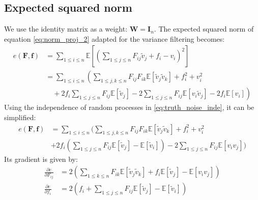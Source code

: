 \documentclass[12pt]{scrartcl}
\begin{document}
\subsection{Expected squared norm}
We use the identity matrix as a weight: $\mathbf{W} = \mathbf{I}_n$. The expected squared norm of equation \eqref{eq:norm_proj_2} adapted for the variance filtering becomes:
\begin{align}
e(\mathbf{F},\mathbf{f}) & = \sum_{1 \le i \le n} \mathbb{E}\left[ \left(\sum_{1 \le j \le n} F_{ij} \widetilde{v}_j + f_i - v_i \right)^2 \right] \nonumber \\
& = \sum_{1 \le i \le n} \left( \sum_{1 \le j,k \le n} F_{ij} F_{ik} \mathbb{E}\left[\widetilde{v}_j \widetilde{v}_k\right] + f_i^2 + v^2_i \right.\nonumber \\
& \left. \quad + 2 f_i \sum_{1 \le j \le n} F_{ij} \mathbb{E}\left[\widetilde{v}_j\right] - 2 \sum_{1 \le j \le n} F_{ij} \mathbb{E}\left[v_i\widetilde{v}_j\right] - 2 f_i \mathbb{E}\left[v_i\right]\right)
\end{align}
Using the independence of random processes in \eqref{eq:truth_noise_inde}, it can be simplified:
\begin{align}
e(\mathbf{F},\mathbf{f}) & = \sum_{1 \le i \le n} \Bigg( \sum_{1 \le j,k \le n} F_{ij} F_{ik} \mathbb{E}\left[\widetilde{v}_j \widetilde{v}_k\right] + f_i^2 + v^2_i \nonumber \\
& + 2 f_i \left(\sum_{1 \le j \le n} F_{ij} \mathbb{E}\left[\widetilde{v}_j\right] - \mathbb{E}\left[\widetilde{v}_i\right]\right)- 2 \sum_{1 \le j \le n} F_{ij} \mathbb{E}\left[v_i v_j\right]\Bigg)
\end{align}
Its gradient is given by:
\begin{subequations}
\begin{align}
\label{eq:var_grad_1}
\frac{\partial e}{\partial F_{ij}} & = 2 \left(\sum_{1 \le k \le n}  F_{ik} \mathbb{E}\left[\widetilde{v}_j \widetilde{v}_k\right] + f_i \mathbb{E}\left[\widetilde{v}_j\right] - \mathbb{E}\left[v_i v_j\right]\right) \\
\frac{\partial e}{\partial f_i} & = 2 \left(f_i + \sum_{1 \le j \le n} F_{ij} \mathbb{E}\left[\widetilde{v}_j\right] - \mathbb{E}\left[\widetilde{v}_i\right]\right)
\end{align}
\end{subequations}
\end{document}

